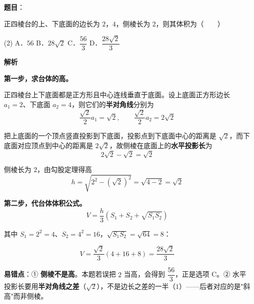 \begin{answer}

\textbf{题目}：

正四棱台的上、下底面的边长为 $2$，$4$，侧棱长为 $2$，则其体积为\mbox{（　　）}

\begin{gkopts}(2)
\task A．$56$
\task B．$28\sqrt2$
\task C．$\dfrac{56}3$
\task D．$\dfrac{28\sqrt2}3$
\end{gkopts}

\textbf{解析}

\textbf{第一步，求台体的高。}

正四棱台上下底面都是正方形且中心连线垂直于底面。设上底面正方形边长 $a_1=2$、下底面 $a_2=4$，则它们的\textbf{半对角线}分别为
\nopagebreak[4]
\[\frac{\sqrt2}2a_1=\sqrt2,\qquad \frac{\sqrt2}2a_2=2\sqrt2\]

把上底面的一个顶点竖直投影到下底面，投影点到下底面中心的距离是 $\sqrt2$，而下底面对应顶点到中心的距离是 $2\sqrt2$，故侧棱在底面上的\textbf{水平投影长}为
\nopagebreak[4]
\[2\sqrt2-\sqrt2=\sqrt2\]

侧棱长为 $2$，由勾股定理得高
\nopagebreak[4]
\[h=\sqrt{2^{2}-\left(\sqrt2\right)^{2}}=\sqrt{4-2}=\sqrt2\]

\textbf{第二步，代台体体积公式。}
\nopagebreak[4]
\[V=\frac h3\left(S_1+S_2+\sqrt{S_1S_2}\right)\]

其中 $S_1=2^{2}=4$、$S_2=4^{2}=16$，$\sqrt{S_1S_2}=\sqrt{64}=8$：

\nopagebreak[4]
\[V=\frac{\sqrt2}3\left(4+16+8\right)=\frac{28\sqrt2}3\]

\begin{gktip}
\textbf{易错点}：① \textbf{侧棱不是高}。本题若误把 $2$ 当高，会得到 $\dfrac{56}3$，正是选项 C。② 水平投影长要用\textbf{半对角线之差}（$\sqrt2$），不是边长之差的一半（$1$）——后者对应的是"斜高"而非侧棱。
\end{gktip}


\par\medskip

\end{answer}
